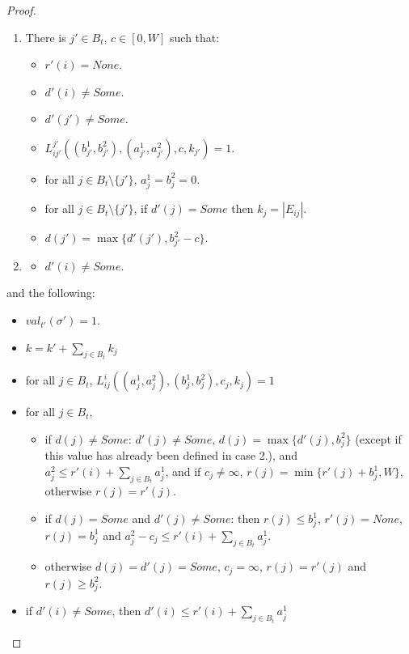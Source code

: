 \documentclass[11pt,letterpaper]{article}
\begin{document}
\begin{proof}
\begin{lemma}
\begin{enumerate}
            \item There is $j'\in B_t$, $c\in [0,W]$ such that:
                \begin{itemize}
                \item $r'(i)=None$.
                \item $d'(i)\neq Some$.
                \item $d'(j')\neq Some$.
                \item $L_{ij'}^{j'}((b_{j'}^1,b_{j'}^2),(a_{j'}^1,a_{j'}^2),c,k_{j'})=1$.
                \item for all $j\in B_t\setminus \{j'\}$, $a_j^1=b_j^2=0$.
                \item for all $j\in B_t\setminus \{j'\}$, if $d'(j)=Some$ then $k_j=|E_{ij}|$.
                \item  $d(j')=\max\{d'(j'),b_{j'}^2-c\}$.
                \end{itemize}
            \item \begin{itemize}
                \item $d'(i)\neq Some$.
            \end{itemize}
        \end{enumerate}

        and the following:
        \begin{itemize}
            \item $val_{t'}(\sigma')=1$.
            \item $k=k'+\sum_{j\in B_t}k_j$
            \item for all $j\in B_t$, $L_{ij}^i((a_j^1,a_j^2),(b_j^1,b_j^2),c_j,k_j)=1$
            \item for all $j\in B_t$, \begin{itemize}
                \item if $d(j)\neq Some$: $d'(j)\neq Some$, $d(j)=\max\{d'(j),b_j^2\}$ (except if this value has already been defined in case 2.), and $a_j^2\leq r'(i)+\sum_{j\in B_t}a_{j}^1$, and if $c_j\neq \infty$, $r(j)=\min\{r'(j)+b_j^1,W\}$, otherwise $r(j)=r'(j)$.
                \item if $d(j)=Some$ and $d'(j)\neq Some$: then $r(j)\leq b_j^1$, $r'(j)=None$, $r(j)=b_j^1$ and $a_j^2-c_j\leq r'(i)+\sum_{j\in B_t}a_{j}^1$.
                \item otherwise $d(j)=d'(j)=Some$, $c_j=\infty$, $r(j)=r'(j)$ and $r(j)\geq b_j^2$.
                \end{itemize}
            \item if $d'(i)\neq Some$, then $d'(i)\leq r'(i)+\sum_{j\in B_t}a_{j}^1$
        \end{itemize}


\end{lemma}
\end{proof}
\end{document}
